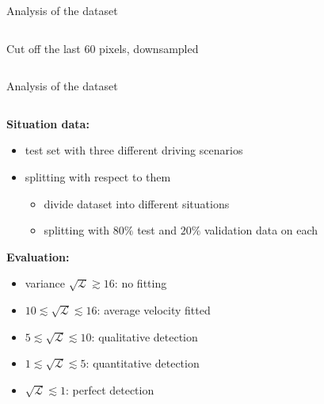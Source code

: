 \begin{frame}{Analysis of the dataset}
\begin{columns}[t]
\begin{column}{.45\textwidth}
\begin{center}
				\small{Cut off the last 60 pixels, downsampled}
			\end{center}
		\end{column}
	\end{columns}
\end{frame}

\begin{frame}{Analysis of the dataset}
	\begin{columns}[c]
		\begin{column}{.55\textwidth}
			\textbf{Situation data:}
			\begin{itemize}
				\item<+-> test set with three different driving scenarios
				\item<+-> splitting with respect to them
				\begin{itemize}
					\item divide dataset into different situations
					\item splitting with $80\%$ test and $20\%$ validation data on each
				\end{itemize}
			\end{itemize}
			\pause
			\textbf{Evaluation:}
			\begin{itemize}
				\item<+-> variance $\sqrt{\mathcal{L}} \gtrsim 16$: no fitting
				\item<+-> $10 \lesssim \sqrt{\mathcal{L}} \lesssim 16$: average velocity fitted
				\item<+-> $5 \lesssim \sqrt{\mathcal{L}} \lesssim 10$: qualitative detection
				\item<+-> $1 \lesssim \sqrt{\mathcal{L}} \lesssim 5$: quantitative detection
				\item<+-> $\sqrt{\mathcal{L}} \lesssim 1$: perfect detection
			\end{itemize}
		\end{column}
		\begin{column}{.45\textwidth}
			\begin{center}
\end{center}
\end{column}
\end{columns}
\end{frame}
